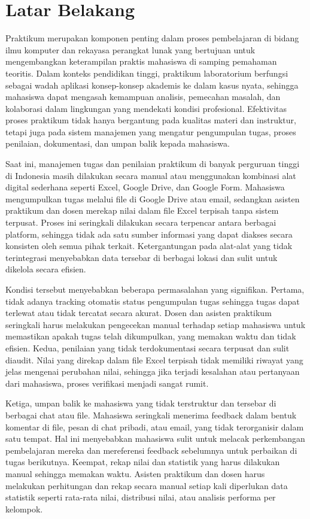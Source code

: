 \documentclass[12pt,a4paper,twoside]{report}
\begin{document}
\section{Latar Belakang}
Praktikum merupakan komponen penting dalam proses pembelajaran di bidang ilmu komputer dan rekayasa perangkat lunak yang bertujuan untuk mengembangkan keterampilan praktis mahasiswa di samping pemahaman teoritis. Dalam konteks pendidikan tinggi, praktikum laboratorium berfungsi sebagai wadah aplikasi konsep-konsep akademis ke dalam kasus nyata, sehingga mahasiswa dapat mengasah kemampuan analisis, pemecahan masalah, dan kolaborasi dalam lingkungan yang mendekati kondisi profesional. Efektivitas proses praktikum tidak hanya bergantung pada kualitas materi dan instruktur, tetapi juga pada sistem manajemen yang mengatur pengumpulan tugas, proses penilaian, dokumentasi, dan umpan balik kepada mahasiswa.

Saat ini, manajemen tugas dan penilaian praktikum di banyak perguruan tinggi di Indonesia masih dilakukan secara manual atau menggunakan kombinasi alat digital sederhana seperti Excel, Google Drive, dan Google Form. Mahasiswa mengumpulkan tugas melalui file di Google Drive atau email, sedangkan asisten praktikum dan dosen merekap nilai dalam file Excel terpisah tanpa sistem terpusat. Proses ini seringkali dilakukan secara terpencar antara berbagai platform, sehingga tidak ada satu sumber informasi yang dapat diakses secara konsisten oleh semua pihak terkait. Ketergantungan pada alat-alat yang tidak terintegrasi menyebabkan data tersebar di berbagai lokasi dan sulit untuk dikelola secara efisien.

Kondisi tersebut menyebabkan beberapa permasalahan yang signifikan. Pertama, tidak adanya tracking otomatis status pengumpulan tugas sehingga tugas dapat terlewat atau tidak tercatat secara akurat. Dosen dan asisten praktikum seringkali harus melakukan pengecekan manual terhadap setiap mahasiswa untuk memastikan apakah tugas telah dikumpulkan, yang memakan waktu dan tidak efisien. Kedua, penilaian yang tidak terdokumentasi secara terpusat dan sulit diaudit. Nilai yang direkap dalam file Excel terpisah tidak memiliki riwayat yang jelas mengenai perubahan nilai, sehingga jika terjadi kesalahan atau pertanyaan dari mahasiswa, proses verifikasi menjadi sangat rumit.

Ketiga, umpan balik ke mahasiswa yang tidak terstruktur dan tersebar di berbagai chat atau file. Mahasiswa seringkali menerima feedback dalam bentuk komentar di file, pesan di chat pribadi, atau email, yang tidak terorganisir dalam satu tempat. Hal ini menyebabkan mahasiswa sulit untuk melacak perkembangan pembelajaran mereka dan mereferensi feedback sebelumnya untuk perbaikan di tugas berikutnya. Keempat, rekap nilai dan statistik yang harus dilakukan manual sehingga memakan waktu. Asisten praktikum dan dosen harus melakukan perhitungan dan rekap secara manual setiap kali diperlukan data statistik seperti rata-rata nilai, distribusi nilai, atau analisis performa per kelompok.
\end{document}
